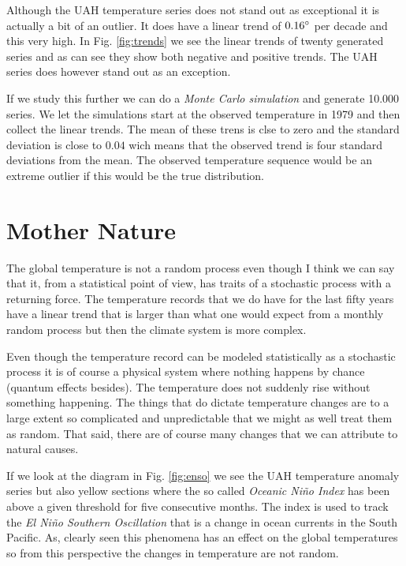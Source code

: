 \documentclass[a4paper,11pt]{article}
\begin{document}
Although the UAH temperature series does not stand out as exceptional
it is actually a bit of an outlier. It does have a linear trend of
$0.16\degree$ per decade and this very high. In Fig. \ref{fig:trends}
we see the linear trends of twenty generated series and as can see they
show both negative and positive trends. The UAH series does however
stand out as an exception. 

If we study this further we can do a {\em Monte Carlo simulation} and
generate 10.000 series. We let the simulations start at the observed
temperature in 1979 and then collect the linear trends. The mean of
these trens is clse to zero and the standard deviation is close to
$0.04$ wich means that the observed trend is four standard deviations
from the mean. The observed temperature sequence would be an extreme
outlier if this would be the true distribution.

\section*{Mother Nature}

The global temperature is not a random process even though I think we
can say that it, from a statistical point of view, has traits of a
stochastic process with a returning force. The temperature records
that we do have for the last fifty years have a linear trend that is
larger than what one would expect from a monthly random process but then
the climate system is more complex.

Even though the temperature record can be modeled statistically as a
stochastic process it is of course a physical system where nothing
happens by chance (quantum effects besides). The temperature does not
suddenly rise without something happening. The things that do dictate
temperature changes are to a large extent so complicated and
unpredictable that we might as well treat them as random. That said,
there are of course many changes that we can attribute to natural
causes.

If we look at the diagram in Fig. \ref{fig:enso} we see the UAH
temperature anomaly series but also yellow sections where the so
called {\em Oceanic Niño Index} \cite{nino:oni} has been above a given
threshold for five consecutive months. The index is used to track the
{\em El Niño Southern Oscillation} that is a change in ocean currents
in the South Pacific. As, clearly seen this phenomena has an effect on
the global temperatures so from this perspective the changes in
temperature are not random.
\end{document}

